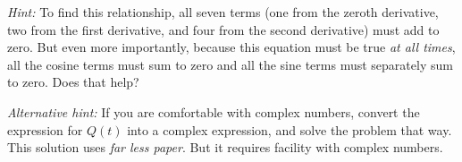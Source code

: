 \documentclass[12pt]{article}
\begin{document}
\textsl{Hint:} To find this relationship, all seven terms (one from
the zeroth derivative, two from the first derivative, and four from
the second derivative) must add to zero. But even more importantly,
because this equation must be true \emph{at all times}, all the cosine
terms must sum to zero and all the sine terms must separately sum to
zero. Does that help?

\textsl{Alternative hint:} If you are comfortable with complex
numbers, convert the expression for $Q(t)$ into a complex expression,
and solve the problem that way. This solution uses \emph{far less
  paper}. But it requires facility with complex numbers.
\end{document}
